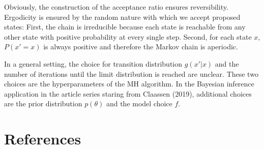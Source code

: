 \documentclass[12pt,english,a4paper,oneside]{article}
\theoremstyle{definition}
\theoremstyle{definition}
\theoremstyle{definition}
\theoremstyle{definition}
\theoremstyle{remark}
\begin{document}
\noindent
Obviously, the construction of the acceptance ratio ensures reversibility. Ergodicity is ensured by the random nature with which we accept proposed states: First, the chain is irreducible because each state is reachable from any other state with positive probability at every single step. Second, for each state \(x\), \(P(x'=x)\) is always positive and therefore the Markov chain is aperiodic.

In a general setting, the choice for transition distribution \(g(x'|x)\) and the number of iterations until the limit distribution is reached are unclear. These two choices are the hyperparameters of the MH algorithm. In the Bayesian inference application in the article series staring from Claassen (2019), additional choices are the prior distribution \(p(\theta)\) and the model choice \(f\).

\newpage

\hypertarget{references}{%
\section*{References}\label{references}}

\singlespacing
\end{document}

